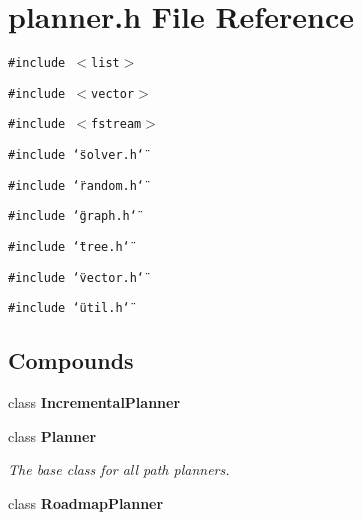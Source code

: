 \section{planner.h File Reference}
\label{planner_8h}
{\tt \#include $<$list$>$}\par
{\tt \#include $<$vector$>$}\par
{\tt \#include $<$fstream$>$}\par
{\tt \#include \char`\"{}solver.h\char`\"{}}\par
{\tt \#include \char`\"{}random.h\char`\"{}}\par
{\tt \#include \char`\"{}graph.h\char`\"{}}\par
{\tt \#include \char`\"{}tree.h\char`\"{}}\par
{\tt \#include \char`\"{}vector.h\char`\"{}}\par
{\tt \#include \char`\"{}util.h\char`\"{}}\par
\subsection*{Compounds}
\begin{CompactItemize}
\item 
class {\bf Incremental\-Planner}
\item 
class {\bf Planner}
\begin{CompactList}\small\item\em The base class for all path planners.\item\end{CompactList}\item 
class {\bf Roadmap\-Planner}
\end{CompactItemize}
